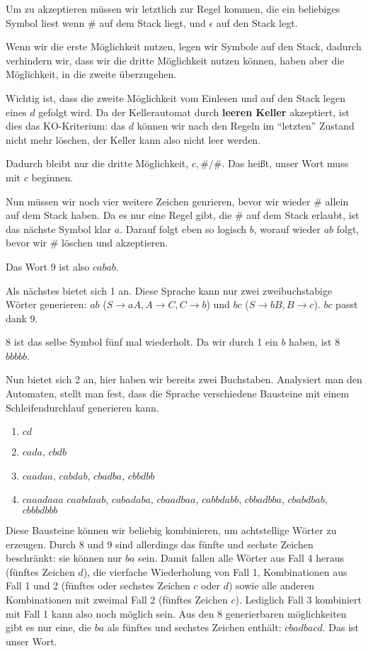 \documentclass{article}
\begin{document}
Um zu akzeptieren müssen wir letztlich zur Regel kommen, die ein beliebiges Symbol liest wenn \# auf dem Stack liegt, und $\epsilon$ auf den Stack legt.

Wenn wir die erste Möglichkeit nutzen, legen wir Symbole auf den Stack, dadurch verhindern wir, dass wir die dritte Möglichkeit nutzen können, haben aber die Möglichkeit, in die zweite überzugehen.

Wichtig ist, dass die zweite Möglichkeit vom Einlesen und auf den Stack legen eines $d$ gefolgt wird. Da der Kellerautomat durch \textbf{leeren Keller} akzeptiert, ist dies das KO-Kriterium: das $d$ können wir nach den Regeln im ``letzten'' Zustand nicht mehr löschen, der Keller kann also nicht leer werden.

Dadurch bleibt nur die dritte Möglichkeit, $c,\#/\#$. Das heißt, unser Wort muss mit $c$ beginnen.

Nun müssen wir noch vier weitere Zeichen genrieren, bevor wir wieder \# allein auf dem Stack haben. Da es nur eine Regel gibt, die \# auf dem Stack erlaubt, ist das nächste Symbol klar $a$. Darauf folgt eben so logisch $b$, worauf wieder $ab$ folgt, bevor wir \# löschen und akzeptieren.

Das Wort 9 ist also $cabab$.

\bigskip

Als nächstes bietet sich 1 an. Diese Sprache kann nur zwei zweibuchstabige Wörter generieren: $ab$ ($S\rightarrow aA, A\rightarrow C, C\rightarrow b$) und $bc$ ($S\rightarrow bB, B\rightarrow c$). $bc$ passt dank 9.

\bigskip

8 ist das selbe Symbol fünf mal wiederholt. Da wir durch 1 ein $b$ haben, ist 8 $bbbbb$.

\bigskip

Nun bietet sich 2 an, hier haben wir bereits zwei Buchstaben.
Analysiert man den Automaten, stellt man fest, dass die Sprache verschiedene Bausteine mit einem Schleifendurchlauf generieren kann.
\begin{enumerate}
	\item $cd$
  \item $cada$, $cbdb$
  \item $caadaa$, $cabdab$, $cbadba$, $cbbdbb$
  \item $caaadaaa$ $caabdaab$, $cabadaba$, $cbaadbaa$, $cabbdabb$, $cbbadbba$, $cbabdbab$, $cbbbdbbb$
\end{enumerate}
Diese Bausteine können wir beliebig kombinieren, um achtstellige Wörter zu erzeugen. Durch 8 und 9 sind allerdings das fünfte und sechste Zeichen beschränkt: sie können nur $ba$ sein.
Damit fallen alle Wörter aus Fall 4 heraus (fünftes Zeichen $d$), die vierfache Wiederholung von Fall 1, Kombinationen aus Fall 1 und 2 (fünftes oder sechstes Zeichen $c$ oder $d$) sowie alle anderen Kombinationen mit zweimal Fall 2 (fünftes Zeichen $c$).
Lediglich Fall 3 kombiniert mit Fall 1 kann also noch möglich sein. Aus den 8 generierbaren möglichkeiten gibt es nur eine, die $ba$ als fünftes und sechstes Zeichen enthält: $cbadbacd$. Das ist unser Wort.
\end{document}
